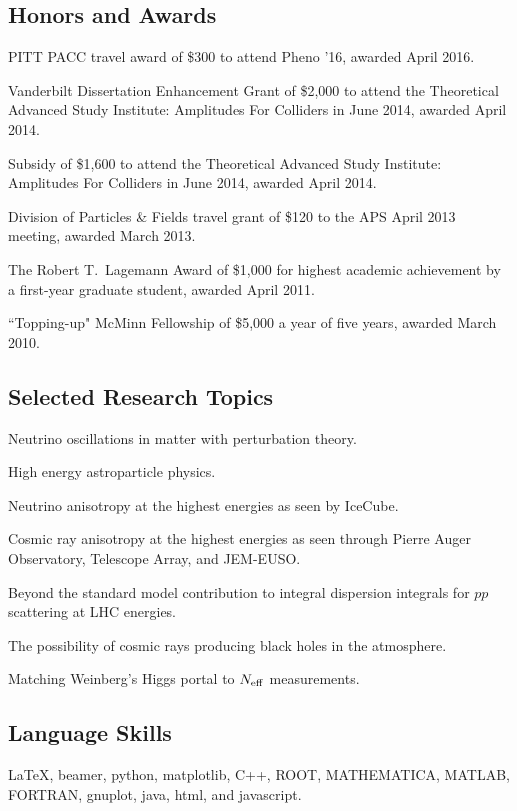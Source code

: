 \documentclass[letterpaper]{article}
\renewenvironment{itemize}{
\begin{list}{}{
\setlength{\leftmargin}{1.5em}
}
}{
\end{list}
}
\begin{document}
\subsection*{Honors and Awards}
\begin{itemize}
\item PITT PACC travel award of \$300 to attend Pheno '16, awarded April 2016.
\item Vanderbilt Dissertation Enhancement Grant of \$2,000 to attend the Theoretical Advanced Study Institute: Amplitudes For Colliders
in June 2014, awarded April 2014.
\item Subsidy of \$1,600 to attend the Theoretical Advanced Study Institute: Amplitudes For Colliders in June 2014, awarded April 2014.
\item Division of Particles \& Fields travel grant of \$120 to the APS April 2013 meeting, awarded March 2013.
\item The Robert T.~Lagemann Award of \$1,000 for highest academic achievement by a first-year graduate student, awarded April 2011.
\item ``Topping-up" McMinn Fellowship of \$5,000 a year of five years, awarded March 2010.
\end{itemize}

\subsection*{Selected Research Topics}
\begin{itemize}
\item Neutrino oscillations in matter with perturbation theory.
\item High energy astroparticle physics.
\item Neutrino anisotropy at the highest energies as seen by IceCube.
\item Cosmic ray anisotropy at the highest energies as seen through Pierre Auger Observatory, Telescope Array, and JEM-EUSO.
\item Beyond the standard model contribution to integral dispersion integrals for $pp$ scattering at LHC energies.
\item The possibility of cosmic rays producing black holes in the atmosphere.
\item Matching Weinberg's Higgs portal to $N_{\rm{eff}}$ measurements.
\end{itemize}

\subsection*{Language Skills}
\begin{itemize}
\item 
\LaTeX, beamer, python, matplotlib, C++, ROOT, MATHEMATICA, MATLAB, FORTRAN, gnuplot, java, html, and javascript.
\end{itemize}
\end{document}
